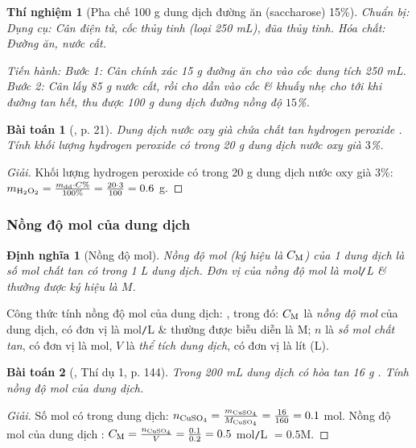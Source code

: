 \documentclass{article}
\newtheorem{baitoan}{Bài toán}
\newtheorem{dinhnghia}{Định nghĩa}
\newtheorem{thinghiem}{Thí nghiệm}
\begin{document}
\begin{thinghiem}[Pha chế 100 g dung dịch đường ăn (saccharose)  15\%]
	 \emph{Chuẩn bị:} Dụng cụ: Cân điện tử, cốc thủy tinh (loại \emph{250 mL}), đũa thủy tinh. Hóa chất: Đường ăn, nước cất.
	 
	 \emph{Tiến hành:} Bước 1: Cân chính xác \emph{15 g} đường ăn cho vào cốc dung tích \emph{250 mL}. Bước 2: Cân lấy \emph{85 g} nước cất, rồi cho dần vào cốc \& khuấy nhẹ cho tới khi đường tan hết, thu được \emph{100 g} dung dịch đường nồng độ $15$\%.
\end{thinghiem}

\begin{baitoan}[\cite{SGK_KHTN_8_KNTTVCS}, p. 21]
	Dung dịch nước oxy già chứa chất tan hydrogen peroxide \emph{}. Tính khối lượng hydrogen peroxide có trong \emph{20 g} dung dịch nước oxy già $3$\%.
\end{baitoan}

\begin{proof}[Giải]
	Khối lượng hydrogen peroxide có trong 20 g dung dịch nước oxy già 3\%: $m_{\ce{H2O2}} = \frac{m_{\rm dd}\cdot C\%}{100\%} = \frac{20\cdot3}{100} = 0.6$ g.
\end{proof}

\subsubsection{Nồng độ mol của dung dịch}

\begin{dinhnghia}[Nồng độ mol]
	\emph{Nồng độ mol} (ký hiệu là $C_{\rm M}$) của 1 dung dịch là số mol chất tan có trong \emph{1 L} dung dịch. Đơn vị của nồng độ mol là \emph{mol\texttt{/}L} \& thường được ký hiệu là $M$.
\end{dinhnghia}
Công thức tính nồng độ mol của dung dịch: , trong đó: $C_{\rm M}$ là \textit{nồng độ mol} của dung dịch, có đơn vị là mol\texttt{/}L \& thường được biễu diễn là M; $n$ là \textit{số mol chất tan}, có đơn vị là mol, $V$ là \textit{thể tích dung dịch}, có đơn vị là lít (L).

\begin{baitoan}[\cite{SGK_Hoa_Hoc_8}, Thí dụ 1, p. 144]
	Trong \emph{200 mL} dung dịch có hòa tan \emph{16 g }. Tính nồng độ mol của dung dịch.
\end{baitoan}

\begin{proof}[Giải]
	Số mol  có trong dung dịch: $n_{\ce{CuSO4}} = \frac{m_{\ce{CuSO4}}}{M_{\ce{CuSO4}}} = \frac{16}{160} = 0.1$ mol. Nồng độ mol của dung dịch : $C_{\rm M} = \frac{n_{\ce{CuSO4}}}{V} = \frac{0.1}{0.2} = 0.5$ mol\texttt{/}L $= 0.5$M.
\end{proof}
\end{document}
